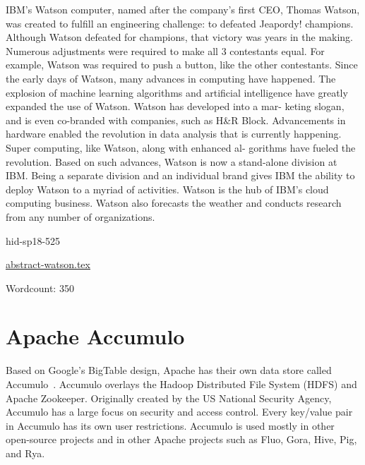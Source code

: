 IBM’s Watson computer, named after the company’s first CEO, Thomas
Watson, was created to fulfill an engineering challenge: to defeated
Jeapordy! champions\cite{hid-sp18-525-watson}. Although Watson defeated
for champions, that victory was years in the making.  Numerous
adjustments were required to make all 3 contestants equal.  For
example, Watson was required to push a button, like the other
contestants\cite{hid-sp18-525-watson}. Since the early days of Watson,
many advances in computing have happened. The explosion of machine
learning algorithms and artificial intelligence have greatly expanded
the use of Watson. Watson has developed into a mar- keting slogan, and
is even co-branded with companies, such as H\&R
Block\cite{hid-sp18-525-watson}. Advancements in hardware enabled the
revolution in data analysis that is currently happening. Super
computing, like Watson, along with enhanced al- gorithms have fueled
the revolution. Based on such advances, Watson is now a stand-alone
division at IBM\cite{hid-sp18-525-watson}. Being a separate division and
an individual brand gives IBM the ability to deploy Watson to a myriad
of activities. Watson is the hub of IBM’s cloud computing business.
Watson also forecasts the weather and conducts research from any
number of organizations\cite{hid-sp18-525-watson}.



\begin{IU}

hid-sp18-525

\href{https://github.com/cloudmesh-community/hid-sp18-525/blob/master//technology/abstract-watson.tex}{abstract-watson.tex}

 

Wordcount: 350

\end{IU}

\section{Apache Accumulo}

Based on Google's BigTable design, Apache has their own
data store called Accumulo~\cite{hid-sp18-526-www-apache-accumulo}.
Accumulo overlays the Hadoop Distributed File System (HDFS) and
Apache Zookeeper. Originally created by the US National Security
Agency, Accumulo has a large focus on security and access control. 
Every key/value pair in Accumulo has its own user restrictions. 
Accumulo is used mostly in other open-source projects and in other 
Apache projects such as Fluo, Gora, Hive, Pig, and Rya.



